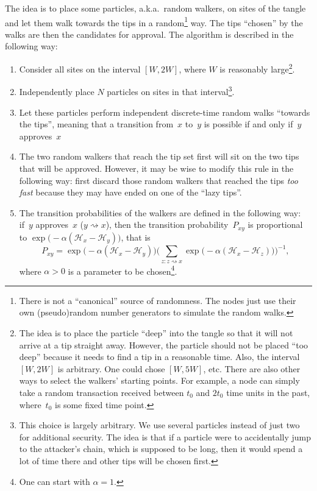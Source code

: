 \documentclass[12pt]{article}
\newcommand{\HH}{\mathcal{H}}
\begin{document}
The idea is to place some particles, a.k.a.\ random walkers,
on sites of the tangle and let them walk towards the tips
in a random\footnote{There is not a ``canonical'' source of randomness.
The nodes just use their own (pseudo)random number generators
to simulate the random walks.} way. The tips ``chosen'' by the walks
are then the candidates for approval.
The algorithm is described in the following way:
\begin{enumerate}
 \item Consider all sites on the interval $[W,2W]$, where 
 $W$ is reasonably large\footnote{The idea is to place the particle ``deep'' into
the tangle so that it will not arrive at a tip straight away. However, the 
particle should not be placed ``too deep'' because it needs to find a tip
 in a reasonable time. Also, the interval $[W,2W]$ is arbitrary. 
One could chose $[W,5W]$, etc.
There are also other ways to select the walkers' starting points.
 For example, a node can simply
take a random transaction received between $t_0$ and
$2t_0$ time units in the past, where~$t_0$ is some fixed time point.}.

 \item Independently place $N$ particles on sites in that
  interval\footnote{This choice
is largely arbitrary. We use several particles instead of just two
for additional security. The idea is that if a particle
were to accidentally jump to the attacker's chain, which is supposed
to be long, then it would spend a lot of time there 
and other tips will be chosen first.}.
 
 \item Let these particles perform independent
 discrete-time random
 walks ``towards the tips'', meaning that a transition
  from~$x$ to~$y$
is possible if and only if~$y$ approves~$x$
 \item The two random walkers that reach the tip set first will
sit on the two tips that will be approved.
However, it may be wise to modify this rule in the 
following way: first discard those random walkers that 
reached the tips \emph{too fast} because they may have ended on one
of the ``lazy tips''.
 \item The transition probabilities
 of the walkers are defined in the following
 way: if~$y$ approves~$x$ ($y\rightsquigarrow x$), 
then the transition probability~$P_{xy}$
 is proportional to $\exp\big(-\alpha(\HH_x-\HH_y)\big)$,
that is
 \begin{equation}
  \label{trans_probs}
   P_{xy} = \exp\big(-\alpha(\HH_x-\HH_y)\big)
\Big(\sum_{z: z \rightsquigarrow x}
 \exp\big(-\alpha(\HH_x-\HH_z)\big)\Big)^{-1},
 \end{equation}
where $\alpha>0$ is a parameter to be chosen\footnote{One can start 
with $\alpha=1$.}.
\end{enumerate}
\end{document}
